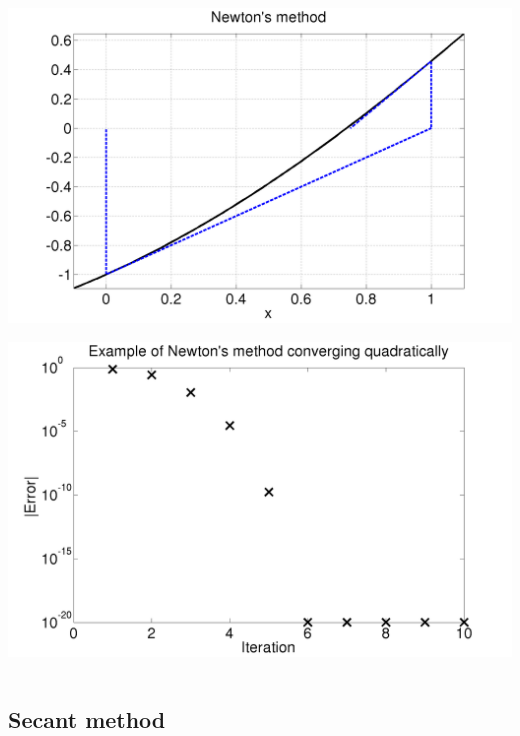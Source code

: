 \documentclass{beamer}
\begin{document}
\begin{frame}
\begin{columns}
\begin{column}{0.5\textwidth}
\begin{overlayarea}{\textwidth}{0.6\textheight}
{\begin{center}
          \end{center}
        }
        {
          \begin{center}
            \includegraphics[width=\textwidth]{figures/NewtonMap3}
          \end{center}
        }
        {
          \begin{center}
            \includegraphics[width=\textwidth]{figures/Newton1}
          \end{center}
        }
      \end{overlayarea}
    \end{column}
  \end{columns}
\end{frame}


\subsection{Secant method}
\end{document}
